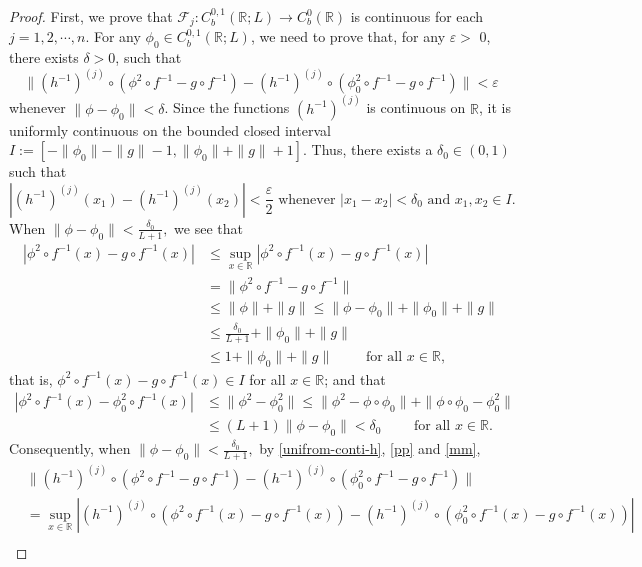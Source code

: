 \documentclass[10pt,a4paper]{amsart}
\renewcommand{\epsilon}{\varepsilon}
\begin{document}
\begin{proof}
 First, we prove that $\mathcal{F}_j: C^{0,1}_b(\mathbb{R};L) \to C^0_b(\mathbb{R})$ is continuous for each $j=1,2,\cdots,n$. For any $\phi_0 \in C_{b}^{0,1}(\mathbb{R};L)$, we need to prove that, for any $\epsilon >$ 0, there exists $\delta >0$, such that 
  $$\|(h^{-1})^{(j)} \circ (\phi^{2} \circ f^{-1}-g \circ f^{-1})-(h^{-1})^{(j)} \circ (\phi_0^{2} \circ f^{-1}-g \circ f^{-1})\|<\epsilon$$ whenever $\|\phi-\phi_0\| < \delta$.
  Since the functions $(h^{-1})^{(j)}$ is continuous on $\mathbb{R}$, it is uniformly continuous on the bounded closed interval $I:= [-\|\phi_0\|-\|g\|-1,\|\phi_0\|+\|g\|+1]$. Thus, there exists a $\delta_0  \in (0,1)$ such that
  \begin{equation}\label{unifrom-conti-h}
   |(h^{-1})^{(j)}(x_1)-(h^{-1})^{(j)}(x_2)|< \frac{\epsilon}{2} \text{ whenever } |x_1-x_2|< \delta_0 \text{ and } x_1,x_2 \in I.   
  \end{equation}
  When $\|\phi-\phi_0\| < \frac{\delta_0}{L+1},$ we see that
  \begin{align}\label{pp}
|\phi^{2} \circ f^{-1}(x)-g \circ f^{-1}(x)| &\le \sup_{x \in \mathbb{R}}|\phi^{2} \circ f^{-1}(x)-g \circ f^{-1}(x)|\nonumber
\\
&=
\|\phi^{2} \circ f^{-1}-g \circ f^{-1}\| \nonumber\\
&\le \|\phi\| +\|g\| \le \|\phi-\phi_0\| +\|\phi_0\|+\|g\|
\nonumber\\
& \le \frac{\delta_0}{L+1} +\| \phi_0 \|+\|g\|
\nonumber\\
&\le 1+\| \phi_0 \|+\|g\| \qquad  \text{ for all } x \in \mathbb{R},
  \end{align}
that is, $ \phi^{2} \circ f^{-1}(x)-g \circ f^{-1}(x) \in I$ for all $ x \in \mathbb{R}$; and that
   \begin{align}\label{mm}
  |\phi^{2} \circ f^{-1}(x)- \phi_0^{2} \circ f^{-1}(x)| &\le \|\phi^{2}-\phi_0^{2}\| \le \|\phi^{2}-\phi \circ \phi_0\| +\|\phi \circ \phi_0-\phi_0^{2}\| \nonumber\\ &\le (L+1)\|\phi-\phi_0\| < \delta_0 \qquad  \text{ for all } x \in \mathbb{R}.
  \end{align}
  Consequently,  when $\|\phi-\phi_0\| < \frac{\delta_0}{L+1},$ by \eqref{unifrom-conti-h}, \eqref{pp} and \eqref{mm}, 
  \begin{align*}
  &\|(h^{-1})^{(j)}\circ (\phi^{2} \circ f^{-1}-g \circ f^{-1})-(h^{-1})^{(j)}\circ (\phi_0^{2}\circ f^{-1}-g \circ f^{-1})\| \\
  &= \sup_{x \in \mathbb{R}}|(h^{-1})^{(j)}\circ (\phi^{2} \circ f^{-1}(x)-g \circ f^{-1}(x))-(h^{-1})^{(j)}\circ (\phi_0^{2} \circ f^{-1}(x)-g \circ f^{-1}(x))|\\

\end{align*}
\end{proof}
\end{document}
